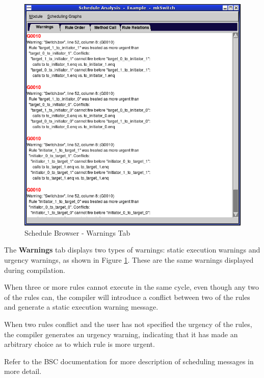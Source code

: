 \documentclass{article}
\begin{document}
\begin{figure}[ht]
\begin{center}
\includegraphics[width = 3.5 in]{figures/schedule_warnings}
\caption{Schedule Browser - Warnings Tab}
\label{fig-warn}
\end{center}
\end{figure}


The  {\bf Warnings} tab displays two types of warnings: static
execution warnings and urgency warnings,  as shown in Figure \ref{fig-warn}.
These are the same warnings displayed during compilation.

When  three or more rules cannot  execute in
the same cycle, even though any two of the rules can, the compiler
will introduce a conflict between two of the rules and generate a
static execution warning message.

When two rules conflict and the user has not specified the urgency of
the rules, the compiler generates an urgency warning, indicating that
it has made  an
arbitrary choice as to which rule is more urgent.

Refer to the BSC documentation for more description of scheduling
messages in more detail.

\end{document}
